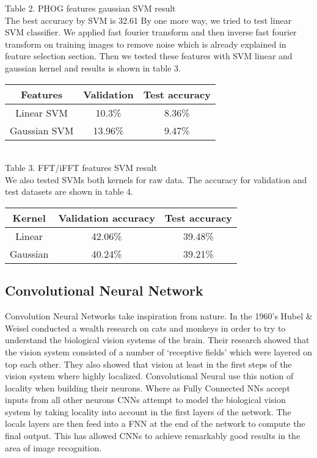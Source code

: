 \documentclass[10pt,twocolumn]{article}
\begin{document}
Table 2. PHOG features gaussian SVM result
\\

The best accuracy by SVM is 32.61%
By one more way, we tried to test linear SVM classifier. We applied fast fourier transform and then inverse fast fourier transform on training images to remove noise which is already explained in feature selection section. Then we tested these features with SVM linear and gaussian kernel and results is shown in table 3.
\\

\begin{tabular}{|c|c|c|}
\hline
Features &	Validation & Test accuracy \\ \hline
Linear SVM	& 10.3\% &	8.36\% \\
Gaussian SVM & 	13.96\% & 9.47\% \\
\hline
\end{tabular}
\\

Table 3. FFT/iFFT features SVM result
\\

We also tested SVMs both kernels for raw data. The accuracy for validation and test datasets are shown in table 4.
\\

\begin{tabular}{|c|c|c|}
\hline
Kernel & Validation accuracy & Test accuracy \\ \hline
Linear & 42.06\% & 39.48\% \\
Gaussian & 40.24\% & 39.21\% \\
\hline
\end{tabular}


\subsection{Convolutional Neural Network}
Convolution Neural Networks take inspiration from nature. In the 1960's Hubel \& Weisel conducted a wealth research on cats and monkeys in order to try to understand the biological vision systems of the brain. Their research showed that the vision system consisted of a number of `receptive fields' which were layered on top each other. They also showed that vision at least in the first steps of the vision system where highly localized. Convolutional Neural use this notion of locality when building their neurons. Where as Fully Connected NNs accept inputs from all other neurons CNNs attempt to model the biological vision system by taking locality into account in the first layers of the network. The locals layers are then feed into a FNN at the end of the network to compute the final output. This has allowed CNNs to achieve remarkably good results in the area of image recognition. 
\end{document}
